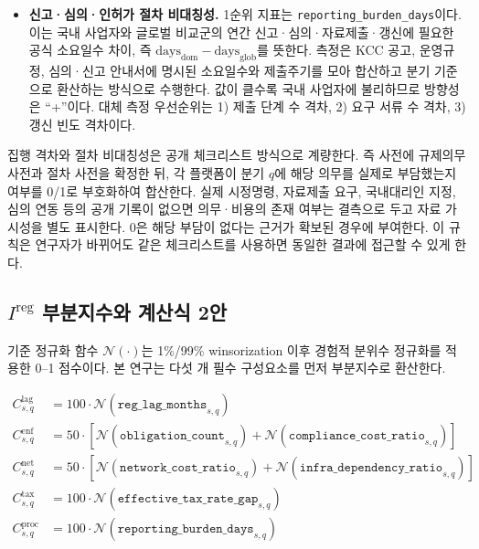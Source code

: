 \documentclass[11pt,a4paper]{report}
\begin{document}
\begin{table}[H]
\begin{itemize}[leftmargin=*, itemsep=0.7em]
  \item \textbf{신고·심의·인허가 절차 비대칭성.} 1순위 지표는 \texttt{reporting\_burden\_days}이다. 이는 국내 사업자와 글로벌 비교군의 연간 신고·심의·자료제출·갱신에 필요한 공식 소요일수 차이, 즉 $\mathrm{days}_{\mathrm{dom}}-\mathrm{days}_{\mathrm{glob}}$를 뜻한다. 측정은 KCC 공고, 운영규정, 심의·신고 안내서에 명시된 소요일수와 제출주기를 모아 합산하고 분기 기준으로 환산하는 방식으로 수행한다. 값이 클수록 국내 사업자에 불리하므로 방향성은 ``+''이다. 대체 측정 우선순위는 1) 제출 단계 수 격차, 2) 요구 서류 수 격차, 3) 갱신 빈도 격차이다.
\end{itemize}
\end{table}

집행 격차와 절차 비대칭성은 공개 체크리스트 방식으로 계량한다. 즉 사전에 규제의무 사전과 절차 사전을 확정한 뒤, 각 플랫폼이 분기 $q$에 해당 의무를 실제로 부담했는지 여부를 0/1로 부호화하여 합산한다. 실제 시정명령, 자료제출 요구, 국내대리인 지정, 심의 연동 등의 공개 기록이 없으면 의무·비용의 존재 여부는 결측으로 두고 자료 가시성을 별도 표시한다. 0은 해당 부담이 없다는 근거가 확보된 경우에 부여한다. 이 규칙은 연구자가 바뀌어도 같은 체크리스트를 사용하면 동일한 결과에 접근할 수 있게 한다.

\subsection{\texorpdfstring{$I^{\mathrm{reg}}$ 부분지수와 계산식 2안}{Ireg 부분지수와 계산식 2안}}
기준 정규화 함수 $\mathcal{N}(\cdot)$는 1\%/99\% winsorization 이후 경험적 분위수 정규화를 적용한 0--1 점수이다. 본 연구는 다섯 개 필수 구성요소를 먼저 부분지수로 환산한다.

\begin{align}
C^{\mathrm{lag}}_{s,q} &= 100 \cdot \mathcal{N}(\texttt{reg\_lag\_months}_{s,q}) \\
C^{\mathrm{enf}}_{s,q} &= 50 \cdot \left[\mathcal{N}(\texttt{obligation\_count}_{s,q}) + \mathcal{N}(\texttt{compliance\_cost\_ratio}_{s,q})\right] \\
C^{\mathrm{net}}_{s,q} &= 50 \cdot \left[\mathcal{N}(\texttt{network\_cost\_ratio}_{s,q}) + \mathcal{N}(\texttt{infra\_dependency\_ratio}_{s,q})\right] \\
C^{\mathrm{tax}}_{s,q} &= 100 \cdot \mathcal{N}(\texttt{effective\_tax\_rate\_gap}_{s,q}) \\
C^{\mathrm{proc}}_{s,q} &= 100 \cdot \mathcal{N}(\texttt{reporting\_burden\_days}_{s,q}) \label{eq:ireg_component_scores}
\end{align}
\end{document}
